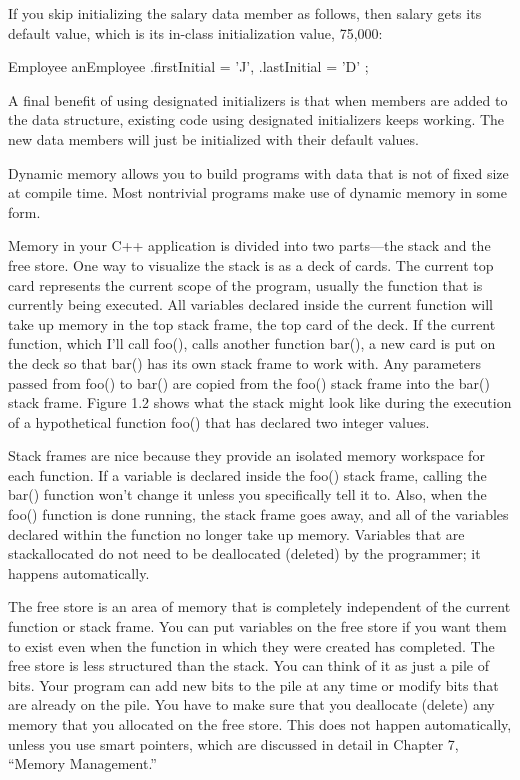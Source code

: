 If you skip initializing the salary data member as follows, then salary gets its default value, which is its in-class initialization value, 75,000:

\begin{cpp}
Employee anEmployee {
    .firstInitial = 'J',
    .lastInitial = 'D'
};
\end{cpp}

A final benefit of using designated initializers is that when members are added to the data structure, existing code using designated initializers keeps working. The new data members will just be initialized with their default values.


Dynamic memory allows you to build programs with data that is not of fixed size at compile time. Most nontrivial programs make use of dynamic memory in some form.



Memory in your C++ application is divided into two parts—the stack and the free store. One way to visualize the stack is as a deck of cards. The current top card represents the current scope of the program, usually the function that is currently being executed. All variables declared inside the current function will take up memory in the top stack frame, the top card of the deck. If the current function, which I’ll call foo(), calls another function bar(), a new card is put on the deck so that bar() has its own stack frame to work with. Any parameters passed from foo() to bar() are copied from the foo() stack frame into the bar() stack frame. Figure 1.2 shows what the stack might look like during the execution of a hypothetical function foo() that has declared two integer values.

Stack frames are nice because they provide an isolated memory workspace for each function. If a variable is declared inside the foo() stack frame, calling the bar() function won’t change it unless you specifically tell it to. Also, when the foo() function is done running, the stack frame goes away, and all of the variables declared within the function no longer take up memory. Variables that are stackallocated do not need to be deallocated (deleted) by the programmer; it happens automatically.

The free store is an area of memory that is completely independent of the current function or stack frame. You can put variables on the free store if you want them to exist even when the function in which they were created has completed. The free store is less structured than the stack. You can think of it as just a pile of bits. Your program can add new bits to the pile at any time or modify bits that are already on the pile. You have to make sure that you deallocate (delete) any memory that you allocated on the free store. This does not happen automatically, unless you use smart pointers, which are discussed in detail in Chapter 7, “Memory Management.”

